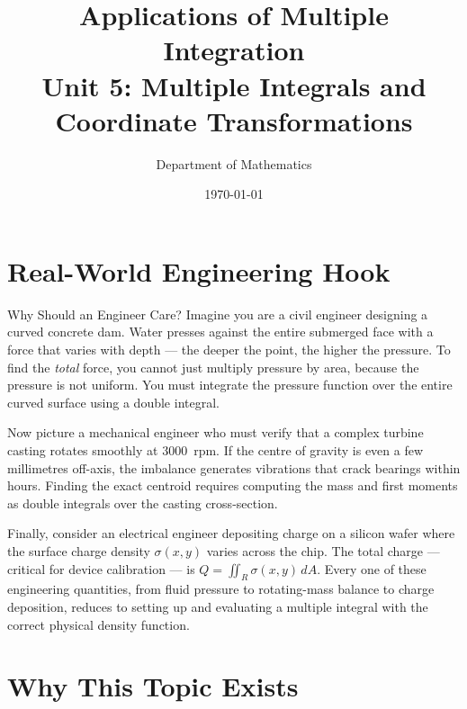 \documentclass[12pt,a4paper]{article}
\title{\textbf{Applications of Multiple Integration} \\ \large Unit 5: Multiple Integrals and Coordinate Transformations}
\author{Department of Mathematics}
\date{\today}
\begin{document}
\maketitle
\tableofcontents
\newpage

\section{Real-World Engineering Hook}

\begin{curiositybox}{Why Should an Engineer Care?}
Imagine you are a civil engineer designing a curved concrete dam. Water presses against the entire submerged face with a force that varies with depth --- the deeper the point, the higher the pressure. To find the \emph{total} force, you cannot just multiply pressure by area, because the pressure is not uniform. You must integrate the pressure function over the entire curved surface using a double integral.

Now picture a mechanical engineer who must verify that a complex turbine casting rotates smoothly at 3000~rpm. If the centre of gravity is even a few millimetres off-axis, the imbalance generates vibrations that crack bearings within hours. Finding the exact centroid requires computing the mass and first moments as double integrals over the casting cross-section.

Finally, consider an electrical engineer depositing charge on a silicon wafer where the surface charge density \(\sigma(x,y)\) varies across the chip. The total charge --- critical for device calibration --- is \(Q = \iint_R \sigma(x,y)\,dA\). Every one of these engineering quantities, from fluid pressure to rotating-mass balance to charge deposition, reduces to setting up and evaluating a multiple integral with the correct physical density function.
\end{curiositybox}

\section{Why This Topic Exists}
\end{document}
